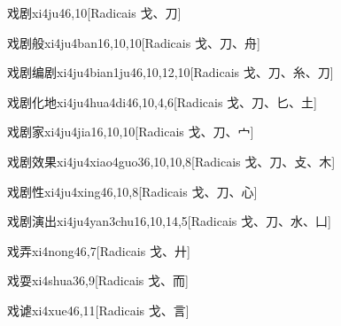 \begin{entry}{戏剧}{xi4ju4}{6,10}[Radicais ⼽、⼑]
\end{entry}

\begin{entry}{戏剧般}{xi4ju4ban1}{6,10,10}[Radicais ⼽、⼑、⾈]
\end{entry}

\begin{entry}{戏剧编剧}{xi4ju4bian1ju4}{6,10,12,10}[Radicais ⼽、⼑、⽷、⼑]
\end{entry}

\begin{entry}{戏剧化地}{xi4ju4hua4di4}{6,10,4,6}[Radicais ⼽、⼑、⼔、⼟]
\end{entry}

\begin{entry}{戏剧家}{xi4ju4jia1}{6,10,10}[Radicais ⼽、⼑、⼧]
\end{entry}

\begin{entry}{戏剧效果}{xi4ju4xiao4guo3}{6,10,10,8}[Radicais ⼽、⼑、⽁、⽊]
\end{entry}

\begin{entry}{戏剧性}{xi4ju4xing4}{6,10,8}[Radicais ⼽、⼑、⼼]
\end{entry}

\begin{entry}{戏剧演出}{xi4ju4yan3chu1}{6,10,14,5}[Radicais ⼽、⼑、⽔、⼐]
\end{entry}

\begin{entry}{戏弄}{xi4nong4}{6,7}[Radicais ⼽、⼶]
\end{entry}

\begin{entry}{戏耍}{xi4shua3}{6,9}[Radicais ⼽、⽽]
\end{entry}

\begin{entry}{戏谑}{xi4xue4}{6,11}[Radicais ⼽、⾔]
\end{entry}

